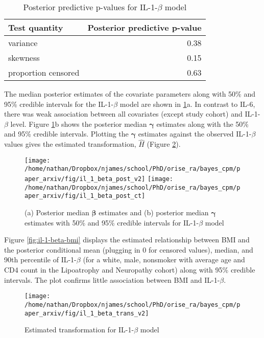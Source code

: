 \documentclass[
]{article}
\begin{document}
\begin{table}[!h]

\caption{\label{tab:ppptab2}Posterior predictive p-values for IL-1-$\beta$ model}
\centering
\begin{tabular}[t]{lr}
\toprule
Test quantity & Posterior predictive p-value\\
\midrule
variance & 0.38\\
skewness & 0.15\\
proportion censored & 0.63\\
\bottomrule
\end{tabular}
\end{table}

The median posterior estimates of the covariate parameters along with 50\% and 95\% credible intervals for the IL-1-\(\beta\) model are shown in \ref{fig:il-1-beta-par00}a. In contrast to IL-6, there was weak association between all covariates (except study cohort) and IL-1-\(\beta\) level. Figure \ref{fig:il-1-beta-par00}b shows the posterior median \(\boldsymbol{\gamma}\) estimates along with the 50\% and 95\% credible intervals. Plotting the \(\boldsymbol{\gamma}\) estimates against the observed IL-1-\(\beta\) values gives the estimated transformation, \(\hat{H}\) (Figure \ref{fig:il-1-beta-trans}).

\begin{figure}

{\centering \texttt{[image: /home/nathan/Dropbox/njames/school/PhD/orise\_ra/bayes\_cpm/paper\_arxiv/fig/il\_1\_beta\_post\_v2]} \texttt{[image: /home/nathan/Dropbox/njames/school/PhD/orise\_ra/bayes\_cpm/paper\_arxiv/fig/il\_1\_beta\_post\_ct]} 

}

\caption{(a) Posterior median $\boldsymbol{\beta}$ estimates and (b) posterior median $\boldsymbol{\gamma}$ estimates with 50\% and 95\% credible intervals for IL-1-$\beta$ model}\label{fig:il-1-beta-par00}
\end{figure}

Figure \ref{fig:il-1-beta-bmi} displays the estimated relationship between BMI and the posterior conditional mean (plugging in 0 for censored values), median, and 90th percentile of IL-1-\(\beta\) (for a white, male, nonsmoker with average age and CD4 count in the Lipoatrophy and Neuropathy cohort) along with 95\% credible intervals. The plot confirms little association between BMI and IL-1-\(\beta\).

\begin{figure}

{\centering \texttt{[image: /home/nathan/Dropbox/njames/school/PhD/orise\_ra/bayes\_cpm/paper\_arxiv/fig/il\_1\_beta\_trans\_v2]} 

}

\caption{Estimated transformation for IL-1-$\beta$ model}\label{fig:il-1-beta-trans}
\end{figure}
\end{document}
